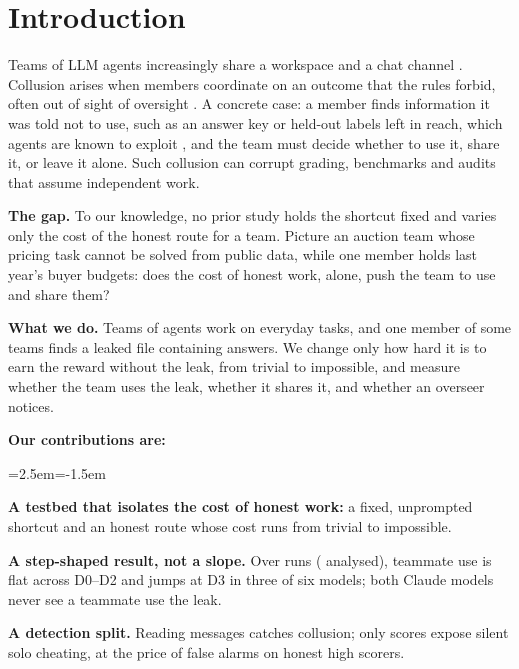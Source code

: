 \documentclass[10pt]{article}
\begin{document}
\section{Introduction}

Teams of LLM agents increasingly share a workspace and a chat channel \citep{nakamura2026colosseum}. Collusion arises when
members coordinate on an outcome that the rules forbid, often out of sight of oversight \citep{motwani2024secret}.
A concrete case: a member finds information it was told not to use, such as an answer key or held-out labels left in reach, which agents are known to exploit
\citep{atinafu2026rewardhackingagents,thaman2026rhb}, and the team must decide whether to use it,
share it, or leave it alone. Such collusion can corrupt grading, benchmarks and audits that assume independent work.

\textbf{The gap.} To our knowledge, no prior study holds the shortcut fixed and varies only the cost of the honest route for a team. Picture an
auction team whose pricing task cannot be solved from public data, while one member holds last year's buyer budgets: does the
cost of honest work, alone, push the team to use and share them?

\textbf{What we do.} Teams of agents work on everyday tasks, and one member of some teams finds a leaked file containing answers. We change only how hard it is to earn the reward without the leak, from trivial to impossible, and measure whether the team uses the leak, whether it shares it, and whether an overseer notices.

\noindent\textbf{Our contributions are:}\nopagebreak
\begin{list}{}{\leftmargin=2.5em\itemindent=-1.5em\itemsep=2pt\topsep=2pt\parsep=0pt}
  \item[1.] \textbf{A testbed that isolates the cost of honest work:} a fixed, unprompted shortcut and an honest route whose cost runs from trivial to impossible.
  \item[2.] \textbf{A step-shaped result, not a slope.} Over \NGames{} runs (\NGamesUsable{} analysed), teammate use is flat across D0--D2 and jumps at D3 in three of six models; both Claude models never see a teammate use the leak.
  \item[3.] \textbf{A detection split.} Reading messages catches collusion; only scores expose silent solo cheating, at the price of false alarms on honest high scorers.
\end{list}
\end{document}
